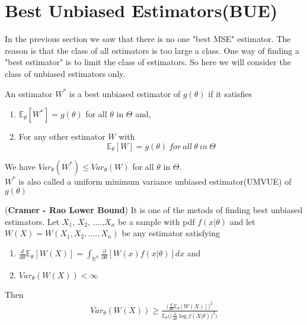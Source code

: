 \documentclass[a4paper,english,12pt]{article}
\begin{document}
\section{Best Unbiased Estimators(BUE)}
In the previous section we saw that there is no one "best MSE" estimator. The reason is that the class of all estimators is too large a class. One way of finding a "best estimator" is to limit the class of estimators. So here we will consider the class of unbiased estimators only.
\begin{defn}
An estimator $W^*$ is a best unbiased estimator of $g(\theta)$ if it satisfies 
\begin{enumerate}
\item $\mathbb{E}_\theta[W^*] = g(\theta)$ for all $\theta$ in $\Theta$ and,
\item For any other estimator $W$ with \[ \mathbb{E}_\theta[W] = g(\theta) \  for \  all \  \theta  \ in \  \Theta \]
\end{enumerate} 
We have $Var_\theta(W^*) \leq Var_\theta(W)$ for all $\theta$ in $\Theta$.\\
$W^*$ is also called a uniform minimum variance unbiased estimator(UMVUE) of $g(\theta)$
\end{defn}
\begin{thm}(\textbf{Cramer - Rao Lower Bound})
It is one of the metods of finding best unbiased estimators. Let $X_1$, $X_2$, ....,$X_n$ be a sample with pdf $f(x | \theta)$ and let $W(X) = W(X_1, X_2,....,X_n)$ be any estimator satisfying
\begin{enumerate}
\item $\frac{d}{d\theta}\mathbb{E}_\theta[W(X)] = \int_{\mathbb{R}^n} \frac{\partial}{\partial \theta}[W(x) f(x | \theta)] dx$ and 
\item $Var_\theta(W(X)) < \infty$ 
\end{enumerate}
Then 
\begin{align*}
Var_\theta(W(X)) \geq \frac{\Big(\frac{d}{d\theta}\mathbb{E}_\theta[W(X)] \Big)^2}{\mathbb{E}_\theta \Big(\big(\frac{\partial}{\partial \theta} \log f(X | \theta)\big)^2\Big)}
\end{align*}
\end{thm}
\end{document}
